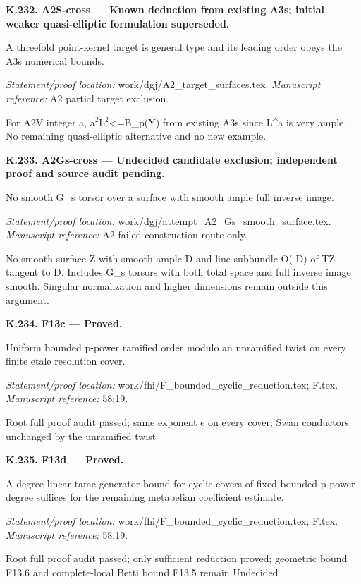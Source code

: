 \par\medskip\noindent\textbf{K.232. A2S-cross --- Known deduction from existing A3s; initial weaker quasi-elliptic formulation superseded.}\par
A threefold point-kernel target is general type and its leading order obeys the A3s numerical bounds.
\par\emph{Statement/proof location:} work/dgj/A2\_target\_surfaces.tex.
\emph{Manuscript reference:} A2 partial target exclusion.
\par For A2V integer a, a\ensuremath{{}^2}L\ensuremath{{}^2}<=B\_p(Y) from existing A3s since L\textasciicircum{}a is very ample. No remaining quasi-elliptic alternative and no new example.
\par\medskip\noindent\textbf{K.233. A2Gs-cross --- Undecided candidate exclusion; independent proof and source audit pending.}\par
No smooth G\_s torsor over a surface with smooth ample full inverse image.
\par\emph{Statement/proof location:} work/dgj/attempt\_A2\_Gs\_smooth\_surface.tex.
\emph{Manuscript reference:} A2 failed-construction route only.
\par No smooth surface Z with smooth ample D and line subbundle O(-D) of TZ tangent to D. Includes G\_s torsors with both total space and full inverse image smooth. Singular normalization and higher dimensions remain outside this argument.
\par\medskip\noindent\textbf{K.234. F13c --- Proved.}\par
Uniform bounded p-power ramified order modulo an unramified twist on every finite etale resolution cover.
\par\emph{Statement/proof location:} work/fhi/F\_bounded\_cyclic\_reduction.tex; F.tex.
\emph{Manuscript reference:} 58:19.
\par Root full proof audit passed; same exponent e on every cover; Swan conductors unchanged by the unramified twist
\par\medskip\noindent\textbf{K.235. F13d --- Proved.}\par
A degree-linear tame-generator bound for cyclic covers of fixed bounded p-power degree suffices for the remaining metabelian coefficient estimate.
\par\emph{Statement/proof location:} work/fhi/F\_bounded\_cyclic\_reduction.tex; F.tex.
\emph{Manuscript reference:} 58:19.
\par Root full proof audit passed; only sufficient reduction proved; geometric bound F13.6 and complete-local Betti bound F13.5 remain Undecided
